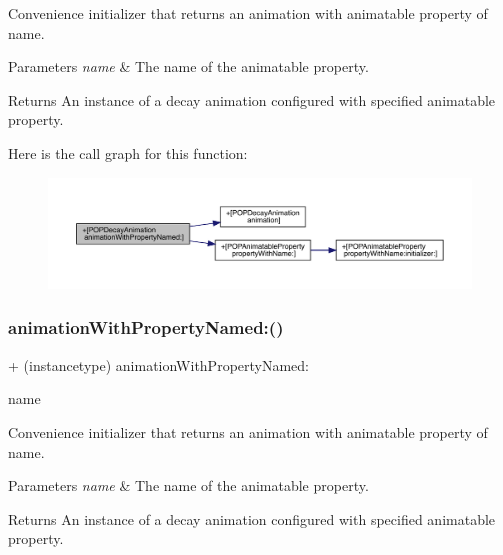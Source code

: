 Convenience initializer that returns an animation with animatable property of name. 
\begin{DoxyParams}{Parameters}
{\em name} & The name of the animatable property. \\
\hline
\end{DoxyParams}
\begin{DoxyReturn}{Returns}
An instance of a decay animation configured with specified animatable property. 
\end{DoxyReturn}
Here is the call graph for this function\+:\nopagebreak
\begin{figure}[H]
\begin{center}
\leavevmode
\includegraphics[width=350pt]{interface_p_o_p_decay_animation_a09e82d62096c9c7b2eb9aac51a565e6f_cgraph}
\end{center}
\end{figure}
\mbox{\label{interface_p_o_p_decay_animation_a09e82d62096c9c7b2eb9aac51a565e6f}} 
\subsubsection{\texorpdfstring{animation\+With\+Property\+Named\+:()}{animationWithPropertyNamed:()}\hspace{0.1cm}{\footnotesize\ttfamily [3/3]}}
{\footnotesize\ttfamily + (instancetype) animation\+With\+Property\+Named\+: \begin{DoxyParamCaption}\item[{(N\+S\+String $\ast$)}]{name }\end{DoxyParamCaption}}

Convenience initializer that returns an animation with animatable property of name. 
\begin{DoxyParams}{Parameters}
{\em name} & The name of the animatable property. \\
\hline
\end{DoxyParams}
\begin{DoxyReturn}{Returns}
An instance of a decay animation configured with specified animatable property. 
\end{DoxyReturn}
\mbox{\label{interface_p_o_p_decay_animation_a2b10ea137ba9122567db921a68365fbe}} 
